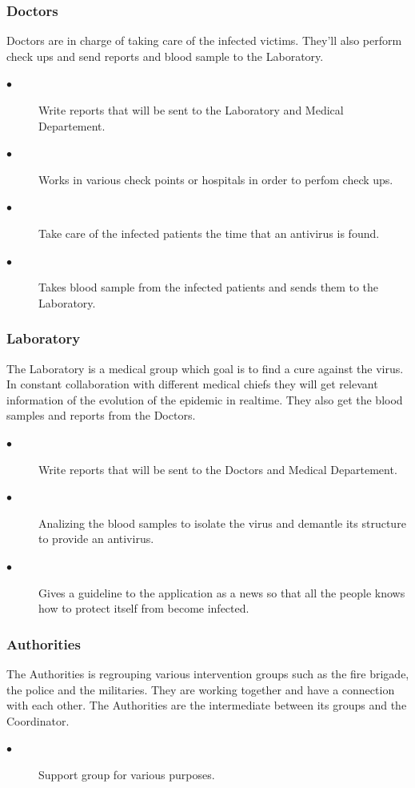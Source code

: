 \subsubsection{Doctors}
Doctors are in charge of taking care of the infected victims. They'll also
perform check ups and send reports and blood sample to the Laboratory.
\begin{description}
 \item[$\bullet$] Write reports that will be sent to the Laboratory and Medical
 Departement.
 \item[$\bullet$] Works in various check points or hospitals in order to perfom
 check ups.
 \item[$\bullet$] Take care of the infected patients the time that an antivirus
 is found.
 \item[$\bullet$] Takes blood sample from the infected patients and sends them
 to the Laboratory.
\end{description} 

\subsubsection{Laboratory}
The Laboratory is a medical group which goal is to find a cure against the
virus. In constant collaboration with different medical chiefs they will get
relevant information of the evolution of the epidemic in realtime. They also get the
blood samples and reports from the Doctors.
\begin{description}
 \item[$\bullet$] Write reports that will be sent to the Doctors and Medical
 Departement.
 \item[$\bullet$] Analizing the blood samples to isolate the virus and demantle
 its structure to provide an antivirus.
 \item[$\bullet$] Gives a guideline to the application as a news so that all the
 people knows how to protect itself from become infected.
\end{description} 

\subsubsection{Authorities}
The Authorities is regrouping various intervention groups such as the fire
brigade, the police and the militaries. They are working together and have a
connection with each other. The Authorities are the intermediate between its
groups and the Coordinator.
\begin{description}
 \item[$\bullet$] Support group for various purposes. 
\end{description}

